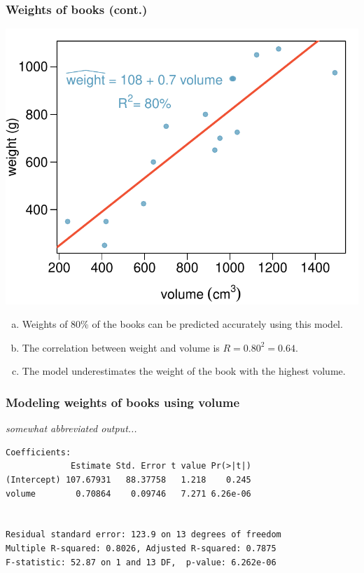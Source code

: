
\begin{frame}
\frametitle{Weights of books (cont.)}

{
}
{
\begin{center}
\includegraphics[width=\textwidth]{8-1_intro_mlr/figures/books/weight_volume}
\end{center}
}

\begin{enumerate}[(a)]
\item Weights of 80\% of the books can be predicted accurately using this model.
\item The correlation between weight and volume is $R = 0.80^2 = 0.64$.
\item The model underestimates the weight of the book with the highest volume.
\end{enumerate}

\end{frame}


\begin{frame}[fragile]
\frametitle{Modeling weights of books using volume}

{\small \textit{somewhat abbreviated output...}}

\begin{verbatim}
Coefficients:
             Estimate Std. Error t value Pr(>|t|)    
(Intercept) 107.67931   88.37758   1.218    0.245    
volume        0.70864    0.09746   7.271 6.26e-06


Residual standard error: 123.9 on 13 degrees of freedom
Multiple R-squared: 0.8026,	Adjusted R-squared: 0.7875 
F-statistic: 52.87 on 1 and 13 DF,  p-value: 6.262e-06 
\end{verbatim}

\end{frame}

